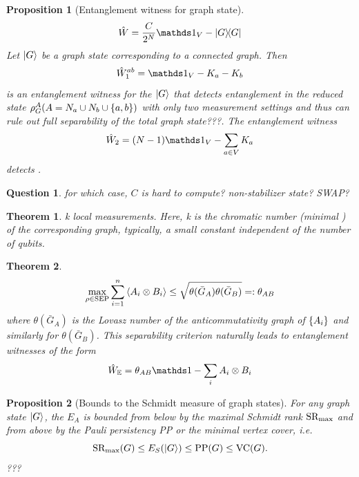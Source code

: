 \documentclass[
10pt,
aps,
pra,
linenumbers,
floatfix,
]{revtex4-2}
\theoremstyle{plain}
\newtheorem{theorem}{Theorem}
\newtheorem{proposition}{Proposition}
\newtheorem{question}{Question}
\theoremstyle{definition}
\newcommand{\ew}{\hat{W}}
\newcommand{\dm}{\rho}
\begin{document}
\begin{proposition}[Entanglement witness for graph state]
	\begin{equation}
		\ew = \frac{C}{2^N} \identity_V - \op{G}
	\end{equation}
	Let $\ket{G}$ be a graph state corresponding to a connected graph. Then
	\begin{equation}
		\ew_1^{ab} = \identity_V - K_a - K_b
	\end{equation}
	is an entanglement witness for the $\ket{G}$ that detects entanglement in the reduced state $\dm_G^A (A=N_a\cup N_b \cup \qty{a,b})$ with only two measurement settings and thus can rule out full separability of the total graph state???. 
	The entanglement witness 
	\begin{equation}
		\ew_2 = (N-1)\identity_V - \sum_{a\in V} K_a
	\end{equation}
	detects . 
\end{proposition}
\begin{question}
	for which case, $C$ is hard to compute? non-stabilizer state? SWAP?
\end{question}
\begin{theorem}
	k local measurements. Here, k is the chromatic number (minimal ) of the corresponding graph, typically, a small constant independent of the number of qubits.
\end{theorem}
\begin{theorem}
	\cite{degoisUncertaintyRelationsGraph2022}
	\begin{equation}
		\max_{\dm\in \text{SEP}} \sum_{i=1}^n \expval{A_i \otimes B_i}
		\le \sqrt{\theta(\bar{G}_A) \theta(\bar{G}_B)} = : \theta_{AB}
	\end{equation}
	where $\theta(\bar{G}_A)$ is the Lovasz number of the anticommutativity graph of $\qty{A_i}$ and similarly for $\theta(\bar{G}_B)$.
	This separability criterion naturally leads to entanglement witnesses of the form 
	\begin{equation}
		\ew_{\mathbb{E}} = \theta_{AB} \identity - \sum_i A_i \otimes B_i
	\end{equation}
\end{theorem}
\begin{proposition}[Bounds to the Schmidt measure of graph states]
	For any graph state $\ket{G}$, the  $E_A$ is bounded from below by the maximal Schmidt rank $\textup{SR}_{\max}$ and from above by the Pauli persistency PP or the minimal vertex cover, i.e.
	\begin{equation}
		\textup{SR}_{\max} (G) \le E_S(\ket{G}) \le \textup{PP}(G) \le \textup{VC}(G).
	\end{equation}
	???
\end{proposition}
\end{document}
